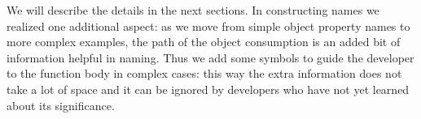 \documentclass[10pt, preprint]{sigplanconf}
\begin{document}
{We will describe the details in the next sections. In constructing names we realized one additional aspect: as we move from simple object property names to more complex examples, the path of the object consumption is an added bit of information helpful in naming. Thus we add some symbols to guide the developer to the function body in complex cases: this way the extra information does not take a lot of space and it can be ignored by developers who have not yet learned about its significance.



}
\end{document}
